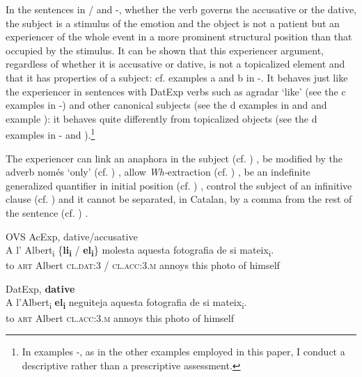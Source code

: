 \documentclass[output=paper,colorlinks,citecolor=brown,nonflat]{./langscibook}
\begin{document}
In the sentences in / and -, whether the verb governs the accusative or the dative, the subject is a stimulus of the emotion and the object is not a patient but an experiencer of the whole event in a more prominent structural position than that occupied by the stimulus. It can be shown that this experiencer argument, regardless of whether it is accusative or dative, is not a topicalized element and that it has properties of a subject: cf. examples {a} and {b} in -. It behaves just like the experiencer in sentences with DatExp verbs such as {agradar} ‘like’ (see the {c} examples in -) and other canonical subjects (see the {d} examples in  and  and example ): it behaves quite differently from topicalized objects (see the {d} examples in - and ).\footnote{In examples -, as in the other examples employed in this paper, I conduct a descriptive rather than a prescriptive assessment.}

The experiencer can link an anaphora in the subject (cf. \citealt{Demonte1989, EgurenFernándezSoriano2004}) , be modified by the adverb {només} ‘only’ (cf. \citealt{Cuervo1999}) , allow \textit{Wh-}extraction (cf. \citealt{BellettiRizzi1988}) , be an indefinite generalized quantifier in initial position (cf. \citealt{BellettiRizzi1988, Masullo1992quirky, Cuervo1999}) , control the subject of an infinitive clause (cf. \citealt{Campos1999, Alsina2008})  and it cannot be separated, in Catalan, by a comma from the rest of the sentence (cf. \citealt{Ginebra2003, Ginebra2005}) .

\ea%
 \label{ex:royo:8}
 \ea OVS AcExp, {dative/accusative} \label{ex:royo:8a}\\
 \gll A l’ Albert\textsubscript{i} \{\textbf{li\textsubscript{i}} / \textbf{el\textsubscript{i}}\} molesta aquesta fotografia de si mateix\textsubscript{i}.\\
  to \textsc{art} Albert {\textsc{cl.dat:3}} / {\textsc{cl.acc:3.m}} annoys this photo of himself\\
\glt {}
 
 \ex DatExp, \textbf{dative}\label{ex:royo:8b}\\
 \gll A l’Albert\textsubscript{i} \textbf{el\textsubscript{i}} neguiteja aquesta fotografia de si mateix\textsubscript{i}.\\
 to \textsc{art} Albert {\textsc{cl.acc:3.m}} annoys this photo of himself\\
\glt {}
 
\end{document}
